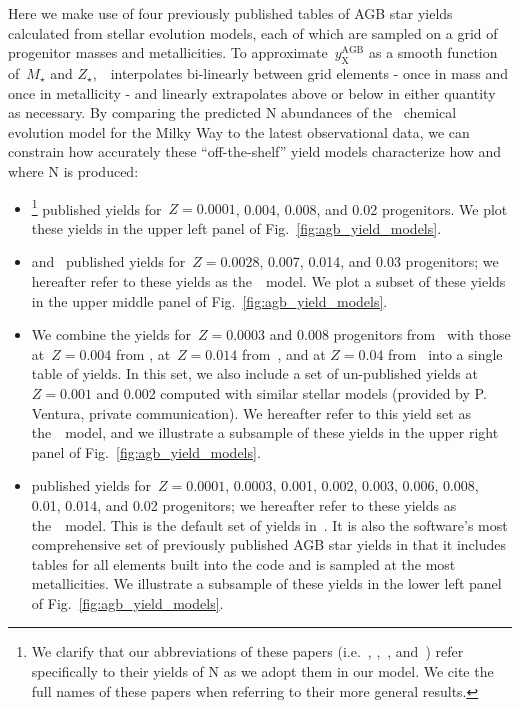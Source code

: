 \documentclass[ms.tex]{subfiles}
\begin{document}
Here we make use of four previously published tables of AGB star yields
calculated from stellar evolution models, each of which are sampled on a grid
of progenitor masses and metallicities.
To approximate~$y_\text{X}^\text{AGB}$ as a smooth function of~$M_\star$ and
$Z_\star$,~\vice~interpolates bi-linearly between grid elements - once in
mass and once in metallicity - and linearly extrapolates above or below in
either quantity as necessary.
By comparing the predicted N abundances of the~\citet{Johnson2021} chemical
evolution model for the Milky Way to the latest observational data, we can
constrain how accurately these ``off-the-shelf'' yield models characterize
how and where N is produced:
\begin{itemize}
	\item[\textbf{1.}] \citet[][hereafter~\karakasten]{Karakas2010}\footnote{
		We clarify that our abbreviations of these papers (i.e.~\karakasten,
		\karakas,~\ventura, and~\cristallo) refer specifically to their yields
		of N as we adopt them in our model.
		We cite the full names of these papers when referring to their more
		general results.
	} published yields for~$Z = 0.0001$, 0.004, 0.008, and 0.02 progenitors.
	We plot these yields in the upper left panel of 
	Fig.~\ref{fig:agb_yield_models}.

	\item[\textbf{2.}] \citet{Karakas2016} and~\citet{Karakas2018} published
	yields for~$Z = 0.0028$, 0.007, 0.014, and 0.03 progenitors; we hereafter
	refer to these yields as the~\karakas~model.
	We plot a subset of these yields in the upper middle panel of
	Fig.~\ref{fig:agb_yield_models}.

	\item[\textbf{3.}] We combine the yields for~$Z = 0.0003$ and 0.008
	progenitors from~\citet{Ventura2013} with those at~$Z = 0.004$ from
	\citet{Ventura2014}, at~$Z = 0.014$ from~\citet{Ventura2018}, and at
	$Z = 0.04$ from~\citet{Ventura2020} into a single table of yields.
	In this set, we also include a set of un-published yields at~$Z = 0.001$
	and 0.002 computed with similar stellar models (provided by P. Ventura,
	private communication).
	We hereafter refer to this yield set as the~\ventura~model, and we
	illustrate a subsample of these yields in the upper right panel of
	Fig.~\ref{fig:agb_yield_models}.

	\item[\textbf{4.}] \citet{Cristallo2011, Cristallo2015} published yields
	for~$Z = 0.0001$, 0.0003, 0.001, 0.002, 0.003, 0.006, 0.008, 0.01, 0.014,
	and 0.02 progenitors; we hereafter refer to these yields as
	the~\cristallo~model.
	This is the default set of yields in~\vice.
	It is also the software's most comprehensive set of previously published
	AGB star yields in that it includes tables for all elements built into the
	code and is sampled at the most metallicities.
	We illustrate a subsample of these yields in the lower left panel of
	Fig.~\ref{fig:agb_yield_models}.
\end{itemize}
\end{document}
